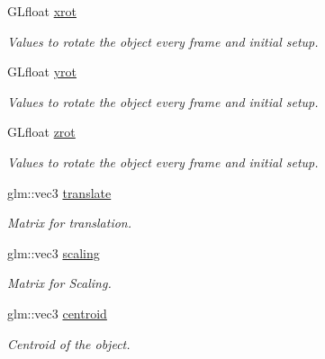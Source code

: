 \begin{DoxyCompactItemize}
\item 
G\+Lfloat \hyperlink{classcft_1_1Model_acbb04bd0c86255df2b5beb20b746d454}{xrot}\hypertarget{classcft_1_1Model_acbb04bd0c86255df2b5beb20b746d454}{}\label{classcft_1_1Model_acbb04bd0c86255df2b5beb20b746d454}

\begin{DoxyCompactList}\small\item\em Values to rotate the object every frame and initial setup. \end{DoxyCompactList}\item 
G\+Lfloat \hyperlink{classcft_1_1Model_a03ad51f746ea311de670b3963b30ca11}{yrot}\hypertarget{classcft_1_1Model_a03ad51f746ea311de670b3963b30ca11}{}\label{classcft_1_1Model_a03ad51f746ea311de670b3963b30ca11}

\begin{DoxyCompactList}\small\item\em Values to rotate the object every frame and initial setup. \end{DoxyCompactList}\item 
G\+Lfloat \hyperlink{classcft_1_1Model_a77a1d55e1de845a548a00f3a037cc846}{zrot}\hypertarget{classcft_1_1Model_a77a1d55e1de845a548a00f3a037cc846}{}\label{classcft_1_1Model_a77a1d55e1de845a548a00f3a037cc846}

\begin{DoxyCompactList}\small\item\em Values to rotate the object every frame and initial setup. \end{DoxyCompactList}\item 
glm\+::vec3 \hyperlink{classcft_1_1Model_a8a73f59bc372ee82bd680a4fedb4c245}{translate}\hypertarget{classcft_1_1Model_a8a73f59bc372ee82bd680a4fedb4c245}{}\label{classcft_1_1Model_a8a73f59bc372ee82bd680a4fedb4c245}

\begin{DoxyCompactList}\small\item\em Matrix for translation. \end{DoxyCompactList}\item 
glm\+::vec3 \hyperlink{classcft_1_1Model_a797c1a16b0d7b41f9d41f455a7ac0b6a}{scaling}\hypertarget{classcft_1_1Model_a797c1a16b0d7b41f9d41f455a7ac0b6a}{}\label{classcft_1_1Model_a797c1a16b0d7b41f9d41f455a7ac0b6a}

\begin{DoxyCompactList}\small\item\em Matrix for Scaling. \end{DoxyCompactList}\item 
glm\+::vec3 \hyperlink{classcft_1_1Model_a7c3ffd13ca3897bc54b5a5f68e48635c}{centroid}\hypertarget{classcft_1_1Model_a7c3ffd13ca3897bc54b5a5f68e48635c}{}\label{classcft_1_1Model_a7c3ffd13ca3897bc54b5a5f68e48635c}

\begin{DoxyCompactList}\small\item\em Centroid of the object. \end{DoxyCompactList}\end{DoxyCompactItemize}

